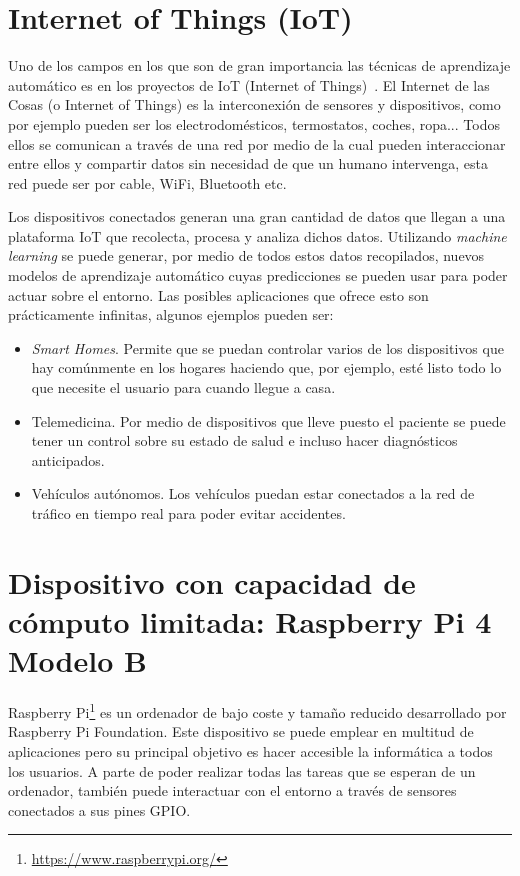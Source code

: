 \documentclass[a4paper, 12pt]{book}
\begin{document}
\section{Internet of Things (IoT)}
\label{sec:IoT}

Uno de los campos en los que son de gran importancia las técnicas de aprendizaje automático es en los proyectos de IoT (Internet of Things)~\cite{Rose2015}. El Internet de las Cosas (o Internet of Things) es la interconexión de sensores y dispositivos, como por ejemplo pueden ser los electrodomésticos, termostatos, coches, ropa... Todos ellos se comunican a través de una red por medio de la cual pueden interaccionar entre ellos y compartir datos sin necesidad de que un humano intervenga, esta red puede ser por cable, WiFi, Bluetooth etc. 

Los dispositivos conectados generan una gran cantidad de datos que llegan a una plataforma IoT que recolecta, procesa y analiza dichos datos. Utilizando \textit{machine learning} se puede generar, por medio de todos estos datos recopilados, nuevos modelos de aprendizaje automático cuyas predicciones se pueden usar para poder actuar sobre el entorno. Las posibles aplicaciones que ofrece esto son prácticamente infinitas, algunos ejemplos pueden ser:

\begin{itemize}
    \item \textit{Smart Homes}. Permite que se puedan controlar varios de los dispositivos que hay comúnmente en los hogares haciendo que, por ejemplo, esté listo todo lo que necesite el usuario para cuando llegue a casa.
    \item Telemedicina. Por medio de dispositivos que lleve puesto el paciente se puede tener un control sobre su estado de salud e incluso hacer diagnósticos anticipados.
    \item Vehículos autónomos. Los vehículos puedan estar conectados a la red de tráfico en tiempo real para poder evitar accidentes.
\end{itemize}

\section{Dispositivo con capacidad de cómputo limitada: Raspberry Pi 4 Modelo B}
\label{sec:dispositivo_hardware}

Raspberry Pi\footnote{\url{https://www.raspberrypi.org/}} es un ordenador de bajo coste y tamaño reducido desarrollado por Raspberry Pi Foundation. Este dispositivo se puede emplear en  multitud de aplicaciones pero su principal objetivo es hacer accesible la informática a todos los usuarios. A parte de poder realizar todas las tareas que se esperan de un ordenador, también puede interactuar con el entorno a través de sensores conectados a sus pines GPIO.
\end{document}
